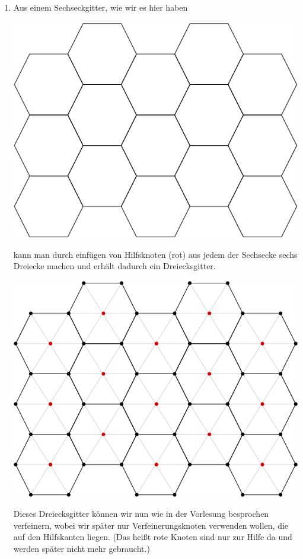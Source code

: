 \documentclass[a4paper,10pt]{scrartcl}
\begin{document}
\begin{enumerate}[1.]
\item Aus einem Sechseckgitter, wie wir es hier haben
\begin{center}
\includegraphics[scale=0.25]{cg2_ex4_4-1.png}\\
\end{center}
kann man durch einf\"ugen von Hilfsknoten (rot) aus jedem der Sechsecke sechs Dreiecke machen und erh\"alt dadurch ein Dreiecksgitter.
\begin{center}
\includegraphics[scale=0.25]{cg2_ex4_4-2.png}\\
\end{center}
Dieses Dreiecksgitter k\"onnen wir nun wie in der Vorlesung besprochen verfeinern, wobei wir sp\"ater nur Verfeinerungsknoten verwenden wollen, die auf den Hilfskanten liegen. (Das hei\ss t rote Knoten sind nur zur Hilfe da und werden sp\"ater nicht mehr gebraucht.)

\end{enumerate}
\end{document}
